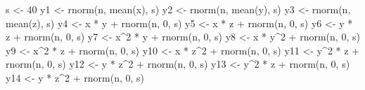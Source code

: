\documentclass[
  11pt,
]{krantz}
\makeatletter
\newenvironment{Shaded}{\begin{snugshade}}{\end{snugshade}}
\newcommand{\DecValTok}[1]{\textcolor[rgb]{0.06,0.06,0.06}{#1}}
\newcommand{\FunctionTok}[1]{\textcolor[rgb]{0,0,0}{#1}}
\newcommand{\NormalTok}[1]{#1}
\newcommand{\OtherTok}[1]{\textcolor[rgb]{0.37,0.37,0.37}{#1}}
\newcommand{\SpecialCharTok}[1]{\textcolor[rgb]{0,0,0}{#1}}
\newenvironment{kframe}{%
\medskip{}
\setlength{\fboxsep}{.8em}
 \def\at@end@of@kframe{}%
 \ifinner\ifhmode%
  \def\at@end@of@kframe{\end{minipage}}%
  \begin{minipage}{\columnwidth}%
 \fi\fi%
 \def\FrameCommand##1{\hskip\@totalleftmargin \hskip-\fboxsep
 \colorbox{shadecolor}{##1}\hskip-\fboxsep
     \hskip-\linewidth \hskip-\@totalleftmargin \hskip\columnwidth}%
 \MakeFramed {\advance\hsize-\width
   \@totalleftmargin\z@ \linewidth\hsize
   \@setminipage}}%
 {\par\unskip\endMakeFramed%
 \at@end@of@kframe}
\renewenvironment{Shaded}{\begin{kframe}}{\end{kframe}}
\theoremstyle{definition}
\theoremstyle{definition}
\theoremstyle{definition}
\theoremstyle{definition}
\theoremstyle{remark}
\makeatother
\begin{document}
\begin{Shaded}
\begin{Highlighting}[]
\NormalTok{s }\OtherTok{\textless{}{-}} \DecValTok{40}
\NormalTok{y1 }\OtherTok{\textless{}{-}} \FunctionTok{rnorm}\NormalTok{(n, }\FunctionTok{mean}\NormalTok{(x), s)}
\NormalTok{y2 }\OtherTok{\textless{}{-}} \FunctionTok{rnorm}\NormalTok{(n, }\FunctionTok{mean}\NormalTok{(y), s)}
\NormalTok{y3 }\OtherTok{\textless{}{-}} \FunctionTok{rnorm}\NormalTok{(n, }\FunctionTok{mean}\NormalTok{(z), s)}
\NormalTok{y4 }\OtherTok{\textless{}{-}}\NormalTok{ x }\SpecialCharTok{*}\NormalTok{ y }\SpecialCharTok{+} \FunctionTok{rnorm}\NormalTok{(n, }\DecValTok{0}\NormalTok{, s)}
\NormalTok{y5 }\OtherTok{\textless{}{-}}\NormalTok{ x }\SpecialCharTok{*}\NormalTok{ z }\SpecialCharTok{+} \FunctionTok{rnorm}\NormalTok{(n, }\DecValTok{0}\NormalTok{, s)}
\NormalTok{y6 }\OtherTok{\textless{}{-}}\NormalTok{ y }\SpecialCharTok{*}\NormalTok{ z }\SpecialCharTok{+} \FunctionTok{rnorm}\NormalTok{(n, }\DecValTok{0}\NormalTok{, s)}
\NormalTok{y7 }\OtherTok{\textless{}{-}}\NormalTok{ x}\SpecialCharTok{\^{}}\DecValTok{2} \SpecialCharTok{*}\NormalTok{ y }\SpecialCharTok{+} \FunctionTok{rnorm}\NormalTok{(n, }\DecValTok{0}\NormalTok{, s)}
\NormalTok{y8 }\OtherTok{\textless{}{-}}\NormalTok{ x }\SpecialCharTok{*}\NormalTok{ y}\SpecialCharTok{\^{}}\DecValTok{2} \SpecialCharTok{+} \FunctionTok{rnorm}\NormalTok{(n, }\DecValTok{0}\NormalTok{, s)}
\NormalTok{y9 }\OtherTok{\textless{}{-}}\NormalTok{ x}\SpecialCharTok{\^{}}\DecValTok{2} \SpecialCharTok{*}\NormalTok{ z }\SpecialCharTok{+} \FunctionTok{rnorm}\NormalTok{(n, }\DecValTok{0}\NormalTok{, s)}
\NormalTok{y10 }\OtherTok{\textless{}{-}}\NormalTok{ x }\SpecialCharTok{*}\NormalTok{ z}\SpecialCharTok{\^{}}\DecValTok{2} \SpecialCharTok{+} \FunctionTok{rnorm}\NormalTok{(n, }\DecValTok{0}\NormalTok{, s)}
\NormalTok{y11 }\OtherTok{\textless{}{-}}\NormalTok{ y}\SpecialCharTok{\^{}}\DecValTok{2} \SpecialCharTok{*}\NormalTok{ z }\SpecialCharTok{+} \FunctionTok{rnorm}\NormalTok{(n, }\DecValTok{0}\NormalTok{, s)}
\NormalTok{y12 }\OtherTok{\textless{}{-}}\NormalTok{ y }\SpecialCharTok{*}\NormalTok{ z}\SpecialCharTok{\^{}}\DecValTok{2} \SpecialCharTok{+} \FunctionTok{rnorm}\NormalTok{(n, }\DecValTok{0}\NormalTok{, s)}
\NormalTok{y13 }\OtherTok{\textless{}{-}}\NormalTok{ y}\SpecialCharTok{\^{}}\DecValTok{2} \SpecialCharTok{*}\NormalTok{ z }\SpecialCharTok{+} \FunctionTok{rnorm}\NormalTok{(n, }\DecValTok{0}\NormalTok{, s)}
\NormalTok{y14 }\OtherTok{\textless{}{-}}\NormalTok{ y }\SpecialCharTok{*}\NormalTok{ z}\SpecialCharTok{\^{}}\DecValTok{2} \SpecialCharTok{+} \FunctionTok{rnorm}\NormalTok{(n, }\DecValTok{0}\NormalTok{, s)}

\end{Highlighting}
\end{Shaded}
\end{document}
